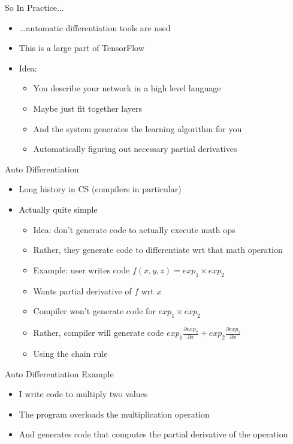 \documentclass[aspectratio=169]{beamer}
\begin{document}
\begin{frame}{So In Practice...}

\begin{itemize}
	\item ...automatic differentiation tools are used
	\item This is a large part of TensorFlow
	\item Idea:
	\begin{itemize}
		\item You describe your network in a high level language
		\item Maybe just fit together layers
		\item And the system generates the learning algorithm for you
		\item Automatically figuring out necessary partial derivatives
	\end{itemize}
\end{itemize}
\end{frame}

\begin{frame}{Auto Differentiation}

\begin{itemize}
        \item Long history in CS (compilers in particular)
	\item Actually quite simple
	\begin{itemize}
	\item Idea: don't generate code to actually execute math ops
	\item Rather, they generate code to differentiate wrt that math operation
	\item Example: user writes code $f(x, y, z) = exp_1 \times exp_2$
	\item Wants partial derivative of $f$ wrt $x$
	\item Compiler won't generate code for $exp_1 \times exp_2$
	\item Rather, compiler will generate code $exp_1 \frac{\partial exp_2}{\partial x} + 
		exp_2 \frac{\partial exp_1}{\partial x}$
	\item Using the chain rule
	\end{itemize}
\end{itemize}
\end{frame}

\begin{frame}{Auto Differentiation Example}

\begin{itemize}
        \item I write code to multiply two values
        \item The program overloads the multiplication operation
        \item And generates code that computes the partial derivative of the operation
        \end{itemize}
\end{frame}
\end{document}
